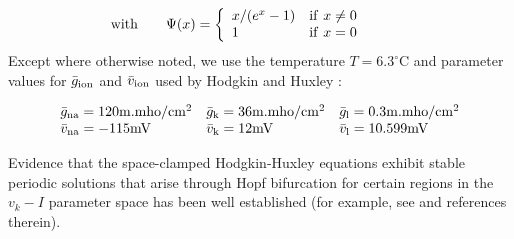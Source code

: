 $${\rm with}\qquad \Psi (x)=\left\{ \begin{array}{ll}
x /(e^x-1) & {\rm if } \  x \ne 0\\
1& {\rm if} \  x= 0
\end{array} \right. \rule{0.4in}{0in} $$
Except where otherwise noted,  we use the temperature
$T=6.3^\circ$C and
parameter values for $\bar g_{\rm ion}$  and
$\bar{v}_{\rm ion}$ used by Hodgkin and Huxley \cite{hh1}:

$$\begin{array}{lll}
	\bar{g}_{\rm na}= 120 {\rm m.mho}/{\rm cm}^2	
&\bar{g}_{\rm k}= 36{\rm m.mho}/ {\rm cm}^2 
&\bar{g}_{\rm l}= 0.3 {\rm m.mho}/{\rm cm}^2\\
	\bar{v}_{\rm na}= -115 {\rm mV}	
&\bar{v}_{\rm k}= 12 {\rm mV}	
&\bar{v}_{\rm l}=10.599 {\rm  mV}
 \end{array}$$

\noindent Evidence that the space-clamped Hodgkin-Huxley equations exhibit stable periodic solutions
that  arise through Hopf bifurcation for certain regions in the $v_k \! - \! I$ parameter space
has been well established (for example, see \cite{rinzel2} and references therein).
